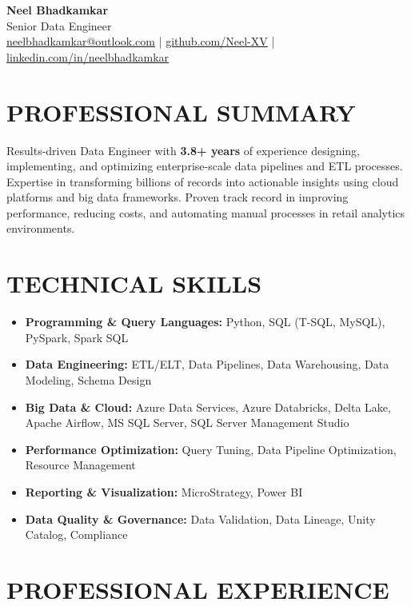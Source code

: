\documentclass[10pt,letterpaper]{article}
\begin{document}
\begin{center}
    {\Large\bfseries Neel Bhadkamkar} \\[2pt]
    {\normalsize Senior Data Engineer} \\[4pt]
    \href{mailto:neelbhadkamkar@outlook.com}{neelbhadkamkar@outlook.com} | 
    \href{https://github.com/Neel-XV}{github.com/Neel-XV} | 
    \href{https://linkedin.com/in/neelbhadkamkar}{linkedin.com/in/neelbhadkamkar}
\end{center}

\section{PROFESSIONAL SUMMARY}
\noindent Results-driven Data Engineer with \textbf{3.8+ years} of experience designing, implementing, and optimizing enterprise-scale data pipelines and ETL processes. Expertise in transforming billions of records into actionable insights using cloud platforms and big data frameworks. Proven track record in improving performance, reducing costs, and automating manual processes in retail analytics environments.

\section{TECHNICAL SKILLS}
\begin{itemize}[leftmargin=*,nosep,itemsep=2pt]
    \item \textbf{Programming \& Query Languages:} Python, SQL (T-SQL, MySQL), PySpark, Spark SQL
    \item \textbf{Data Engineering:} ETL/ELT, Data Pipelines, Data Warehousing, Data Modeling, Schema Design
    \item \textbf{Big Data \& Cloud:} Azure Data Services, Azure Databricks, Delta Lake, Apache Airflow, MS SQL Server, SQL Server Management Studio
    \item \textbf{Performance Optimization:} Query Tuning, Data Pipeline Optimization, Resource Management
    \item \textbf{Reporting \& Visualization:} MicroStrategy, Power BI
    \item \textbf{Data Quality \& Governance:} Data Validation, Data Lineage, Unity Catalog, Compliance
\end{itemize}

\section{PROFESSIONAL EXPERIENCE}
\end{document}
